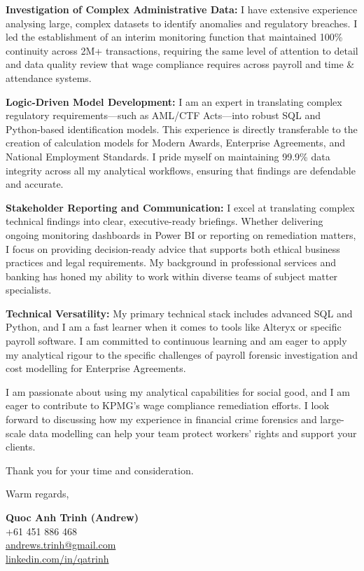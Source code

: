 \documentclass[11pt, a4paper]{article}
\begin{document}
\textbf{Investigation of Complex Administrative Data:}
I have extensive experience analysing large, complex datasets to identify anomalies and regulatory breaches. I led the establishment of an interim monitoring function that maintained 100\% continuity across 2M+ transactions, requiring the same level of attention to detail and data quality review that wage compliance requires across payroll and time \& attendance systems.

\textbf{Logic-Driven Model Development:}
I am an expert in translating complex regulatory requirements—such as AML/CTF Acts—into robust SQL and Python-based identification models. This experience is directly transferable to the creation of calculation models for Modern Awards, Enterprise Agreements, and National Employment Standards. I pride myself on maintaining 99.9\% data integrity across all my analytical workflows, ensuring that findings are defendable and accurate.

\textbf{Stakeholder Reporting and Communication:}
I excel at translating complex technical findings into clear, executive-ready briefings. Whether delivering ongoing monitoring dashboards in Power BI or reporting on remediation matters, I focus on providing decision-ready advice that supports both ethical business practices and legal requirements. My background in professional services and banking has honed my ability to work within diverse teams of subject matter specialists.

\textbf{Technical Versatility:}
My primary technical stack includes advanced SQL and Python, and I am a fast learner when it comes to tools like Alteryx or specific payroll software. I am committed to continuous learning and am eager to apply my analytical rigour to the specific challenges of payroll forensic investigation and cost modelling for Enterprise Agreements.

I am passionate about using my analytical capabilities for social good, and I am eager to contribute to KPMG’s wage compliance remediation efforts. I look forward to discussing how my experience in financial crime forensics and large-scale data modelling can help your team protect workers' rights and support your clients.

Thank you for your time and consideration.

\vspace{20pt}

Warm regards,

\vspace{30pt}

\textbf{Quoc Anh Trinh (Andrew)}\\
+61 451 886 468\\
\href{mailto:andrews.trinh@gmail.com}{andrews.trinh@gmail.com}\\
\href{https://www.linkedin.com/in/qatrinh}{linkedin.com/in/qatrinh}
\end{document}
